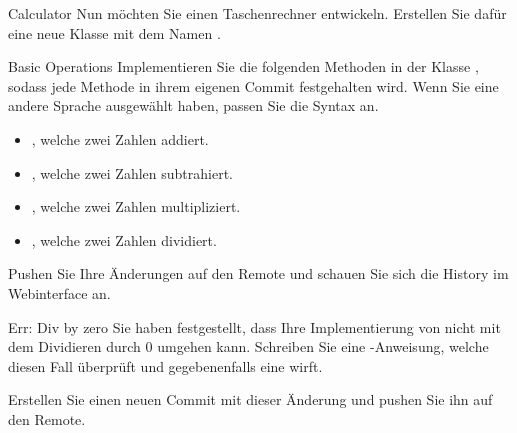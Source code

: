 \documentclass[
    english, accentcolor=TUDa-1c,
    fontsize= 12pt, a4paper, aspectratio=169, colorback=true, fancy_row_colors, boxarc=3pt,
]{algoexercise}
\begin{document}
    \begin{task}{Calculator}
        Nun möchten Sie einen Taschenrechner entwickeln.
        Erstellen Sie dafür eine neue Klasse mit dem Namen .

        \begin{subtask*}{Basic Operations}
            Implementieren Sie die folgenden Methoden in der Klasse , sodass jede Methode in ihrem eigenen Commit
            festgehalten wird.
            Wenn Sie eine andere Sprache ausgewählt haben, passen Sie die Syntax an.
            \begin{itemize}
                \item {}, welche zwei Zahlen addiert.
                \item {}, welche zwei Zahlen subtrahiert.
                \item {}, welche zwei Zahlen multipliziert.
                \item {}, welche zwei Zahlen dividiert.
            \end{itemize}
            Pushen Sie Ihre Änderungen auf den Remote und schauen Sie sich die History im Webinterface an.
        \end{subtask*}

        \begin{subtask*}{Err: Div by zero}
            Sie haben festgestellt, dass Ihre Implementierung von  nicht mit dem Dividieren durch 0 umgehen kann.
            Schreiben Sie eine
            -Anweisung, welche diesen Fall überprüft und gegebenenfalls eine  wirft.

            Erstellen Sie einen neuen Commit mit dieser Änderung und pushen Sie ihn auf den Remote.
        \end{subtask*}
    \end{task}
\end{document}

